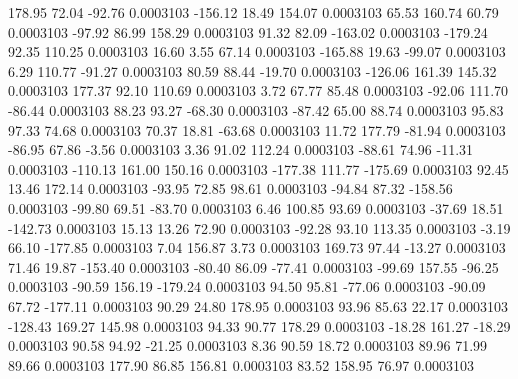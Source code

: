       178.95       72.04      -92.76     0.0003103
     -156.12       18.49      154.07     0.0003103
       65.53      160.74       60.79     0.0003103
      -97.92       86.99      158.29     0.0003103
       91.32       82.09     -163.02     0.0003103
     -179.24       92.35      110.25     0.0003103
       16.60        3.55       67.14     0.0003103
     -165.88       19.63      -99.07     0.0003103
        6.29      110.77      -91.27     0.0003103
       80.59       88.44      -19.70     0.0003103
     -126.06      161.39      145.32     0.0003103
      177.37       92.10      110.69     0.0003103
        3.72       67.77       85.48     0.0003103
      -92.06      111.70      -86.44     0.0003103
       88.23       93.27      -68.30     0.0003103
      -87.42       65.00       88.74     0.0003103
       95.83       97.33       74.68     0.0003103
       70.37       18.81      -63.68     0.0003103
       11.72      177.79      -81.94     0.0003103
      -86.95       67.86       -3.56     0.0003103
        3.36       91.02      112.24     0.0003103
      -88.61       74.96      -11.31     0.0003103
     -110.13      161.00      150.16     0.0003103
     -177.38      111.77     -175.69     0.0003103
       92.45       13.46      172.14     0.0003103
      -93.95       72.85       98.61     0.0003103
      -94.84       87.32     -158.56     0.0003103
      -99.80       69.51      -83.70     0.0003103
        6.46      100.85       93.69     0.0003103
      -37.69       18.51     -142.73     0.0003103
       15.13       13.26       72.90     0.0003103
      -92.28       93.10      113.35     0.0003103
       -3.19       66.10     -177.85     0.0003103
        7.04      156.87        3.73     0.0003103
      169.73       97.44      -13.27     0.0003103
       71.46       19.87     -153.40     0.0003103
      -80.40       86.09      -77.41     0.0003103
      -99.69      157.55      -96.25     0.0003103
      -90.59      156.19     -179.24     0.0003103
       94.50       95.81      -77.06     0.0003103
      -90.09       67.72     -177.11     0.0003103
       90.29       24.80      178.95     0.0003103
       93.96       85.63       22.17     0.0003103
     -128.43      169.27      145.98     0.0003103
       94.33       90.77      178.29     0.0003103
      -18.28      161.27      -18.29     0.0003103
       90.58       94.92      -21.25     0.0003103
        8.36       90.59       18.72     0.0003103
       89.96       71.99       89.66     0.0003103
      177.90       86.85      156.81     0.0003103
       83.52      158.95       76.97     0.0003103
